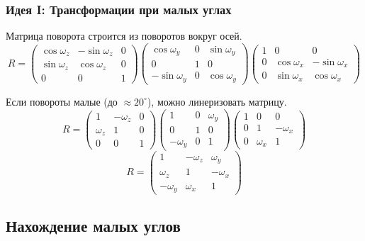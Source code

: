 \documentclass{beamer}
\begin{document}
\begin{frame}
\frametitle{Идея I: Трансформации при малых углах}
Матрица поворота строится из поворотов вокруг осей.
$$R = 
\begin{pmatrix} 
\cos{\omega_z} & -\sin{\omega_z} & 0 \\
\sin{\omega_z} & \cos{\omega_z} & 0 \\
0 & 0 & 1
\end{pmatrix}
\begin{pmatrix} 
\cos{\omega_y} & 0 & \sin{\omega_y} \\
0 & 1 & 0 \\
-\sin{\omega_y} & 0 & \cos{\omega_y}
\end{pmatrix}
\begin{pmatrix} 
1 & 0 & 0 \\
0 & \cos{\omega_x} & -\sin{\omega_x} \\
0 & \sin{\omega_x} & \cos{\omega_x}
\end{pmatrix}$$

Если повороты малые (до $\approx 20^\circ$), можно линеризовать матрицу.
$$ R = 
\begin{pmatrix} 
1 & -\omega_z & 0 \\
\omega_z & 1 & 0 \\
0 & 0 & 1
\end{pmatrix}
\begin{pmatrix} 
1 & 0 & \omega_y \\
0 & 1 & 0 \\
-\omega_y & 0 & 1 
\end{pmatrix}
\begin{pmatrix} 
1 & 0 & 0 \\
0 & 1 & -\omega_x \\
0 & \omega_x & 1
\end{pmatrix}$$
$$R = \begin{pmatrix} 
1 & -\omega_z & \omega_y \\
\omega_z & 1 & -\omega_x \\
-\omega_y & \omega_x & 1
\end{pmatrix}$$
\end{frame}

\subsection{Нахождение малых углов}
\end{document}
